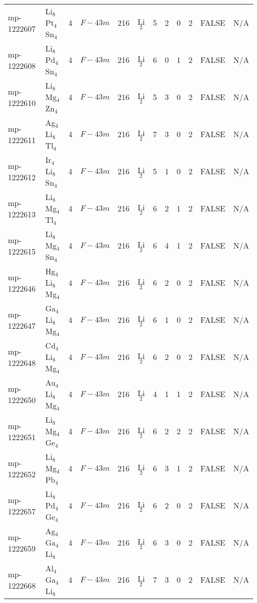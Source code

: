 {\begin{longtable}{llcccccccccc}
    mp-1222607 & Li$_{8}$Pt$_{4}$Sn$_{4}$ & 4     & $F-43m$ & 216   & Li$_{2}$ & 5     & 2     & 0     & 2     & FALSE & N/A \\
    mp-1222608 & Li$_{8}$Pd$_{4}$Sn$_{4}$ & 4     & $F-43m$ & 216   & Li$_{2}$ & 6     & 0     & 1     & 2     & FALSE & N/A \\
    mp-1222610 & Li$_{8}$Mg$_{4}$Zn$_{4}$ & 4     & $F-43m$ & 216   & Li$_{2}$ & 5     & 3     & 0     & 2     & FALSE & N/A \\
    mp-1222611 & Ag$_{4}$Li$_{8}$Tl$_{4}$ & 4     & $F-43m$ & 216   & Li$_{2}$ & 7     & 3     & 0     & 2     & FALSE & N/A \\
    mp-1222612 & Ir$_{4}$Li$_{8}$Sn$_{4}$ & 4     & $F-43m$ & 216   & Li$_{2}$ & 5     & 1     & 0     & 2     & FALSE & N/A \\
    mp-1222613 & Li$_{8}$Mg$_{4}$Tl$_{4}$ & 4     & $F-43m$ & 216   & Li$_{2}$ & 6     & 2     & 1     & 2     & FALSE & N/A \\
    mp-1222615 & Li$_{8}$Mg$_{4}$Sn$_{4}$ & 4     & $F-43m$ & 216   & Li$_{2}$ & 6     & 4     & 1     & 2     & FALSE & N/A \\
    mp-1222646 & Hg$_{4}$Li$_{8}$Mg$_{4}$ & 4     & $F-43m$ & 216   & Li$_{2}$ & 6     & 2     & 0     & 2     & FALSE & N/A \\
    mp-1222647 & Ga$_{4}$Li$_{8}$Mg$_{4}$ & 4     & $F-43m$ & 216   & Li$_{2}$ & 6     & 1     & 0     & 2     & FALSE & N/A \\
    mp-1222648 & Cd$_{4}$Li$_{8}$Mg$_{4}$ & 4     & $F-43m$ & 216   & Li$_{2}$ & 6     & 2     & 0     & 2     & FALSE & N/A \\
    mp-1222650 & Au$_{4}$Li$_{8}$Mg$_{4}$ & 4     & $F-43m$ & 216   & Li$_{2}$ & 4     & 1     & 1     & 2     & FALSE & N/A \\
    mp-1222651 & Li$_{8}$Mg$_{4}$Ge$_{4}$ & 4     & $F-43m$ & 216   & Li$_{2}$ & 6     & 2     & 2     & 2     & FALSE & N/A \\
    mp-1222652 & Li$_{8}$Mg$_{4}$Pb$_{4}$ & 4     & $F-43m$ & 216   & Li$_{2}$ & 6     & 3     & 1     & 2     & FALSE & N/A \\
    mp-1222657 & Li$_{8}$Pd$_{4}$Ge$_{4}$ & 4     & $F-43m$ & 216   & Li$_{2}$ & 6     & 2     & 0     & 2     & FALSE & N/A \\
    mp-1222659 & Ag$_{4}$Ga$_{4}$Li$_{8}$ & 4     & $F-43m$ & 216   & Li$_{2}$ & 6     & 3     & 0     & 2     & FALSE & N/A \\
    mp-1222668 & Al$_{4}$Ga$_{4}$Li$_{8}$ & 4     & $F-43m$ & 216   & Li$_{2}$ & 7     & 3     & 0     & 2     & FALSE & N/A \\

\end{longtable}}

